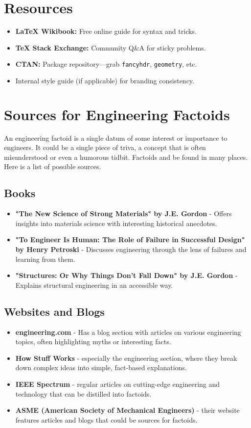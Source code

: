 \documentclass[11pt,letterpaper]{article}
\newcommand{\sectiontitle}[1]{\section*{\large \textbf{#1}}}
\begin{document}
\sectiontitle{Resources}
\begin{itemize}
  \item \textbf{LaTeX Wikibook:} Free online guide for syntax and tricks.
  \item \textbf{TeX Stack Exchange:} Community Q\&A for sticky problems.
  \item \textbf{CTAN:} Package repository—grab \texttt{fancyhdr}, \texttt{geometry}, etc.
  \item Internal style guide (if applicable) for branding consistency.
\end{itemize}

\section*{Sources for Engineering Factoids}
An engineering factoid is a single datum of some interest or importance to engineers. It could be a single piece of triva, a concept that is often misunderstood or even a humorous tidbit. Factoids and be found in many places. Here is a list of possible sources.

\subsection*{Books}
\begin{itemize}
\item \textbf{"The New Science of Strong Materials" by J.E. Gordon} - Offers insights into materials science with interesting historical anecdotes.
\item \textbf{"To Engineer Is Human: The Role of Failure in Successful Design" by Henry Petroski } - Discusses engineering through the lens of failures and learning from them.
\item \textbf{"Structures: Or Why Things Don't Fall Down" by J.E. Gordon} - Explains structural engineering in an accessible way.
\end{itemize}

\subsection*{Websites and Blogs}
\begin{itemize}
\item \textbf{engineering.com} - Has a blog section with articles on various engineering topics, often highlighting myths or interesting facts.

\item \textbf{How Stuff Works} - especially the engineering section, where they break down complex ideas into simple, fact-based explanations.

\item \textbf{IEEE Spectrum} - regular articles on cutting-edge engineering and technology that can be distilled into factoids.
\item \textbf{ASME (American Society of Mechanical Engineers)} - their website features articles and blogs that could be sources for factoids.
\end{itemize}
\end{document}
